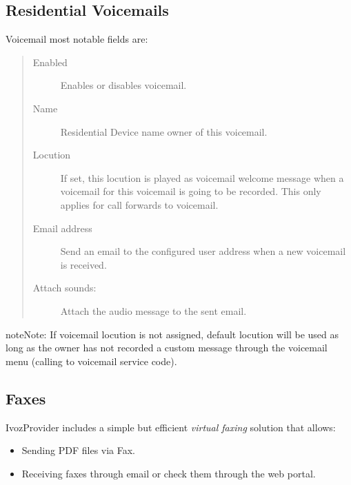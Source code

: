 \documentclass[letterpaper,10pt,english]{sphinxmanual}
\begin{document}
\subsection{Residential Voicemails}
\label{administration_portal/client/residential/residential_voicemails:residential-voicemails}\label{administration_portal/client/residential/residential_voicemails::doc}\label{administration_portal/client/residential/residential_voicemails:id1}
Voicemail most notable fields are:
\begin{quote}
\begin{description}
\item[{Enabled}] \leavevmode
Enables or disables voicemail.

\item[{Name}] \leavevmode
Residential Device name owner of this voicemail.

\item[{Locution}] \leavevmode
If set, this locution is played as voicemail welcome message when a voicemail
for this voicemail is going to be recorded. This only applies for call forwards
to voicemail.

\item[{Email address}] \leavevmode
Send an email to the configured user address when a new voicemail is received.

\item[{Attach sounds:}] \leavevmode
Attach the audio message to the sent email.

\end{description}
\end{quote}

\begin{notice}{note}{Note:}
If voicemail locution is not assigned, default locution will be used as long as
the owner has not recorded a custom message through the voicemail menu (calling to
voicemail service code).
\end{notice}


\subsection{Faxes}
\label{administration_portal/client/residential/faxes:faxes}\label{administration_portal/client/residential/faxes::doc}
IvozProvider includes a simple but efficient \emph{virtual faxing} solution that allows:
\begin{itemize}
\item {} 
Sending PDF files via Fax.

\item {} 
Receiving faxes through email or check them through the web portal.

\end{itemize}
\end{document}
